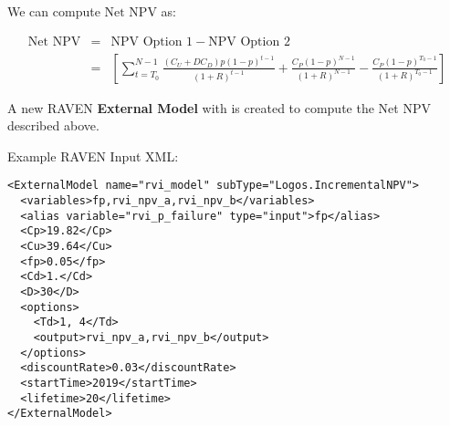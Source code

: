 We can compute  \( \text{Net NPV} \)  as:\par




\begin{eqnarray}\label{npv_12}
\mbox{Net NPV}&=&\mbox{NPV Option }1-\mbox{NPV Option }2\\
&=& \left[  \sum _{t=T_{0}}^{N-1}\frac{ \left( C_{U}+DC_{D} \right) p \left( 1-p \right) ^{t-1}}{ \left( 1+R \right) ^{t-1}}+\frac{C_{P} \left( 1-p \right) ^{N-1}}{ \left( 1+R \right) ^{N-1}}-\frac{C_{P} \left( 1-p \right) ^{T_{0}-1}}{ \left( 1+R \right) ^{T_{0}-1}} \right]
\end{eqnarray}

A new RAVEN \textbf{External Model} with  
is created to compute the Net NPV described above.

Example RAVEN Input  XML:
\begin{lstlisting}[style=XML]
<ExternalModel name="rvi_model" subType="Logos.IncrementalNPV">
  <variables>fp,rvi_npv_a,rvi_npv_b</variables>
  <alias variable="rvi_p_failure" type="input">fp</alias>
  <Cp>19.82</Cp>
  <Cu>39.64</Cu>
  <fp>0.05</fp>
  <Cd>1.</Cd>
  <D>30</D>
  <options>
    <Td>1, 4</Td>
    <output>rvi_npv_a,rvi_npv_b</output>
  </options>
  <discountRate>0.03</discountRate>
  <startTime>2019</startTime>
  <lifetime>20</lifetime>
</ExternalModel>
\end{lstlisting}

